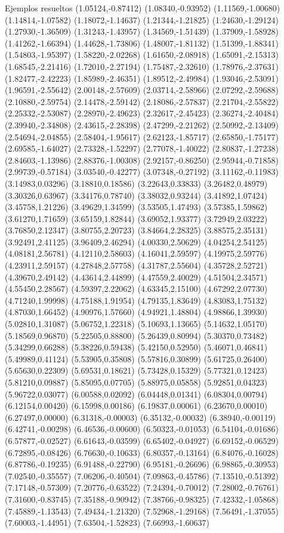 \documentclass[11pt,a4paper]{article}
\begin{document}
\begin{fmex}{Ejemplos resueltos}
(1.05124,-0.87412) (1.08340,-0.93952) (1.11569,-1.00680) (1.14814,-1.07582) (1.18072,-1.14637) (1.21344,-1.21825) (1.24630,-1.29124) (1.27930,-1.36509) (1.31243,-1.43957) (1.34569,-1.51439) (1.37909,-1.58928) (1.41262,-1.66394) (1.44628,-1.73806) (1.48007,-1.81132) (1.51399,-1.88341) (1.54803,-1.95397) (1.58220,-2.02268) (1.61650,-2.08918) (1.65091,-2.15313) (1.68545,-2.21416) (1.72010,-2.27194) (1.75487,-2.32610) (1.78976,-2.37631) (1.82477,-2.42223) (1.85989,-2.46351) (1.89512,-2.49984) (1.93046,-2.53091) (1.96591,-2.55642) (2.00148,-2.57609) (2.03714,-2.58966) (2.07292,-2.59688) (2.10880,-2.59754) (2.14478,-2.59142) (2.18086,-2.57837) (2.21704,-2.55822) (2.25332,-2.53087) (2.28970,-2.49623) (2.32617,-2.45423) (2.36274,-2.40484) (2.39940,-2.34808) (2.43615,-2.28398) (2.47299,-2.21262) (2.50992,-2.13409) (2.54694,-2.04855) (2.58404,-1.95617) (2.62123,-1.85717) (2.65850,-1.75177) (2.69585,-1.64027) (2.73328,-1.52297) (2.77078,-1.40022) (2.80837,-1.27238) (2.84603,-1.13986) (2.88376,-1.00308) (2.92157,-0.86250) (2.95944,-0.71858) (2.99739,-0.57184) (3.03540,-0.42277) (3.07348,-0.27192) (3.11162,-0.11983) (3.14983,0.03296) (3.18810,0.18586) (3.22643,0.33833) (3.26482,0.48979) (3.30326,0.63967) (3.34176,0.78740) (3.38032,0.93244) (3.41892,1.07424) (3.45758,1.21226) (3.49629,1.34599) (3.53505,1.47493) (3.57385,1.59862) (3.61270,1.71659) (3.65159,1.82844) (3.69052,1.93377) (3.72949,2.03222) (3.76850,2.12347) (3.80755,2.20723) (3.84664,2.28325) (3.88575,2.35131) (3.92491,2.41125) (3.96409,2.46294) (4.00330,2.50629) (4.04254,2.54125) (4.08181,2.56781) (4.12110,2.58603) (4.16041,2.59597) (4.19975,2.59776) (4.23911,2.59157) (4.27848,2.57758) (4.31787,2.55604) (4.35728,2.52721) (4.39670,2.49142) (4.43614,2.44899) (4.47559,2.40029) (4.51504,2.34571) (4.55450,2.28567) (4.59397,2.22062) (4.63345,2.15100) (4.67292,2.07730) (4.71240,1.99998) (4.75188,1.91954) (4.79135,1.83649) (4.83083,1.75132) (4.87030,1.66452) (4.90976,1.57660) (4.94921,1.48804) (4.98866,1.39930) (5.02810,1.31087) (5.06752,1.22318) (5.10693,1.13665) (5.14632,1.05170) (5.18569,0.96870) (5.22505,0.88800) (5.26439,0.80994) (5.30370,0.73482) (5.34299,0.66288) (5.38226,0.59438) (5.42150,0.52950) (5.46071,0.46841) (5.49989,0.41124) (5.53905,0.35808) (5.57816,0.30899) (5.61725,0.26400) (5.65630,0.22309) (5.69531,0.18621) (5.73428,0.15329) (5.77321,0.12423) (5.81210,0.09887) (5.85095,0.07705) (5.88975,0.05858) (5.92851,0.04323) (5.96722,0.03077) (6.00588,0.02092) (6.04448,0.01341) (6.08304,0.00794) (6.12154,0.00420) (6.15998,0.00186) (6.19837,0.00061) (6.23670,0.00010) (6.27497,0.00000) (6.31318,-0.00003) (6.35132,-0.00032) (6.38940,-0.00119) (6.42741,-0.00298) (6.46536,-0.00600) (6.50323,-0.01053) (6.54104,-0.01686) (6.57877,-0.02527) (6.61643,-0.03599) (6.65402,-0.04927) (6.69152,-0.06529) (6.72895,-0.08426) (6.76630,-0.10633) (6.80357,-0.13164) (6.84076,-0.16028) (6.87786,-0.19235) (6.91488,-0.22790) (6.95181,-0.26696) (6.98865,-0.30953) (7.02540,-0.35557) (7.06206,-0.40504) (7.09863,-0.45786) (7.13510,-0.51392) (7.17148,-0.57309) (7.20776,-0.63522) (7.24394,-0.70012) (7.28002,-0.76761) (7.31600,-0.83745) (7.35188,-0.90942) (7.38766,-0.98325) (7.42332,-1.05868) (7.45889,-1.13543) (7.49434,-1.21320) (7.52968,-1.29168) (7.56491,-1.37055) (7.60003,-1.44951) (7.63504,-1.52823) (7.66993,-1.60637) 
\end{fmex}
\end{document}
